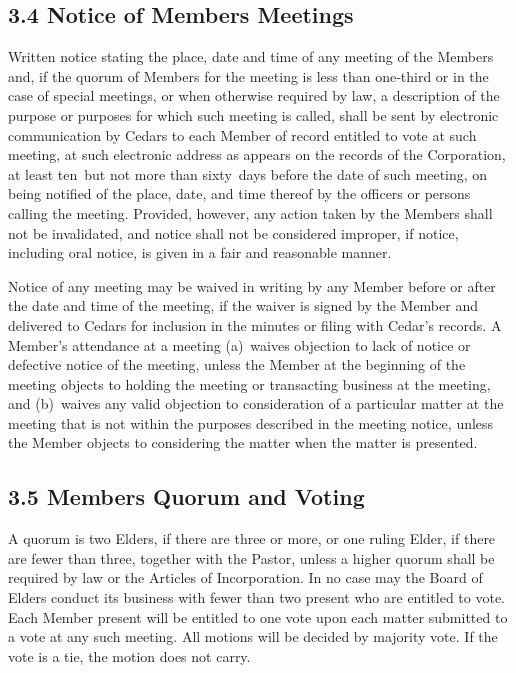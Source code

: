 \documentclass[
]{book}
\begin{document}
\subsection*{3.4 Notice of Members Meetings}\label{notice-of-members-meetings}

Written notice stating the place, date and time of any meeting of the Members and, if the quorum of Members for the meeting is less than one‑third or in the case of special meetings, or when otherwise required by law, a description of the purpose or purposes for which such meeting is called, shall be sent by electronic communication by Cedars to each Member of record entitled to vote at such meeting, at such electronic address as appears on the records of the Corporation, at least ten~but not more than sixty~days before the date of such meeting, on being notified of the place, date, and time thereof by the officers or persons calling the meeting. Provided, however, any action taken by the Members shall not be invalidated, and notice shall not be considered improper, if notice, including oral notice, is given in a fair and reasonable manner.

Notice of any meeting may be waived in writing by any Member before or after the date and time of the meeting, if the waiver is signed by the Member and delivered to Cedars for inclusion in the minutes or filing with Cedar's records. A Member's attendance at a meeting (a)~waives objection to lack of notice or defective notice of the meeting, unless the Member at the beginning of the meeting objects to holding the meeting or transacting business at the meeting, and (b)~waives any valid objection to consideration of a particular matter at the meeting that is not within the purposes described in the meeting notice, unless the Member objects to considering the matter when the matter is presented.

\subsection*{3.5 Members Quorum and Voting}\label{members-quorum-and-voting}

A quorum is two Elders, if there are three or more, or one ruling Elder, if there are fewer than three, together with the Pastor, unless a higher quorum shall be required by law or the Articles of Incorporation. In no case may the Board of Elders conduct its business with fewer than two present who are entitled to vote. Each Member present will be entitled to one vote upon each matter submitted to a vote at any such meeting. All motions will be decided by majority vote. If the vote is a tie, the motion does not carry.
\end{document}
